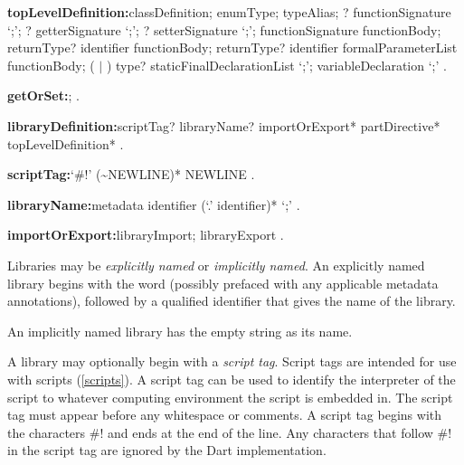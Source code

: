 \documentclass{article}
\begin{document}
\begin{grammar}
{\bf topLevelDefinition:}classDefinition;
  enumType;
  typeAlias;
  \EXTERNAL{}? functionSignature `{\escapegrammar ;}';
  \EXTERNAL{}? getterSignature `{\escapegrammar ;}';
  \EXTERNAL{}? setterSignature `{\escapegrammar ;}';
  functionSignature functionBody;
  returnType? \GET{} identifier functionBody;
  returnType? \SET{} identifier formalParameterList functionBody;
  (\FINAL{} $|$ \CONST{}) type? staticFinalDeclarationList `{\escapegrammar ;}';
  variableDeclaration `{\escapegrammar ;}'
  .

{\bf getOrSet:}\GET{};
  \SET{}
  .

{\bf libraryDefinition:}scriptTag? libraryName? importOrExport* partDirective*
  \gnewline{} topLevelDefinition*
  .

{\bf scriptTag:}`\#!' {\escapegrammar (\~{}NEWLINE)*} NEWLINE
  .

{\bf libraryName:}metadata \LIBRARY{} identifier (`{\escapegrammar .}' identifier)* `{\escapegrammar ;}'
  .

{\bf importOrExport:}libraryImport;
  libraryExport
  .
\end{grammar}

\LMHash{}
Libraries may be {\em explicitly named} or {\em implicitly named}.
An explicitly named library begins with the word \LIBRARY{} (possibly prefaced with any applicable metadata annotations), followed by a qualified identifier that gives the name of the library.


\LMHash{}
An implicitly named library has the empty string as its name.



\LMHash{}
A library may optionally begin with a {\em script tag}.
Script tags are intended for use with scripts (\ref{scripts}).
A script tag can be used to identify the interpreter of the script to whatever computing environment the script is embedded in.
The script tag must appear before any whitespace or comments.
A script tag begins with the characters \#! and ends at the end of the line.
Any characters that follow \#! in the script tag are ignored by the Dart implementation.
\end{document}
